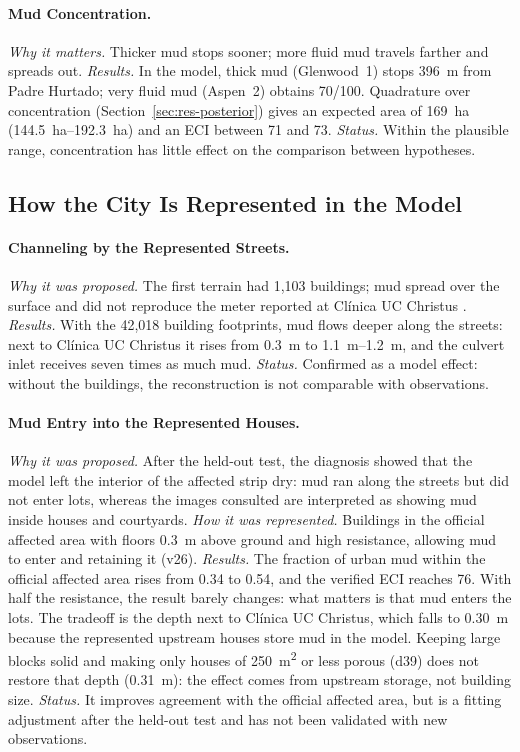 \paragraph{Mud Concentration.} \emph{Why it matters.} Thicker mud stops sooner; more fluid mud travels farther and spreads out. \emph{Results.} In the model, thick mud (Glenwood~1) stops \SI{396}{m} from Padre Hurtado; very fluid mud (Aspen~2) obtains 70/100. Quadrature over concentration (Section~\ref{sec:res-posterior}) gives an expected area of \SI{169}{ha} (\SIrange{144.5}{192.3}{ha}) and an ECI between 71 and 73. \emph{Status.} Within the plausible range, concentration has little effect on the comparison between hypotheses.

\subsection{How the City Is Represented in the Model}
\paragraph{Channeling by the Represented Streets.} \emph{Why it was proposed.} The first terrain had 1,103 buildings; mud spread over the surface and did not reproduce the meter reported at Clínica UC Christus \citep{cadena3_2026}. \emph{Results.} With the 42,018 building footprints, mud flows deeper along the streets: next to Clínica UC Christus it rises from \SI{0.3}{m} to \SIrange{1.1}{1.2}{m}, and the culvert inlet receives seven times as much mud. \emph{Status.} Confirmed as a model effect: without the buildings, the reconstruction is not comparable with observations.

\paragraph{Mud Entry into the Represented Houses.} \emph{Why it was proposed.} After the held-out test, the diagnosis showed that the model left the interior of the affected strip dry: mud ran along the streets but did not enter lots, whereas the images consulted are interpreted as showing mud inside houses and courtyards. \emph{How it was represented.} Buildings in the official affected area with floors \SI{0.3}{m} above ground and high resistance, allowing mud to enter and retaining it (v26). \emph{Results.} The fraction of urban mud within the official affected area rises from 0.34 to 0.54, and the verified ECI reaches 76. With half the resistance, the result barely changes: what matters is that mud enters the lots. The tradeoff is the depth next to Clínica UC Christus, which falls to \SI{0.30}{m} because the represented upstream houses store mud in the model. Keeping large blocks solid and making only houses of \SI{250}{m^2} or less porous (d39) does not restore that depth (\SI{0.31}{m}): the effect comes from upstream storage, not building size.
\emph{Status.} It improves agreement with the official affected area, but is a fitting adjustment after the held-out test and has not been validated with new observations.

